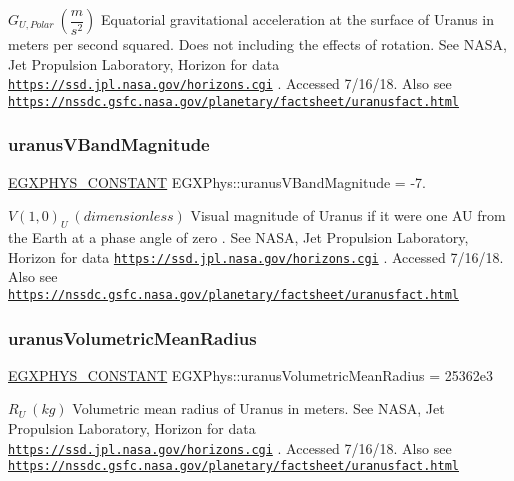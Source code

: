 $ G_{U,Polar} \ (\dfrac{m}{s^2})$ Equatorial gravitational acceleration at the surface of Uranus in meters per second squared. Does not including the effects of rotation. See N\+A\+SA, Jet Propulsion Laboratory, Horizon for data \href{https://ssd.jpl.nasa.gov/horizons.cgi}{\tt https\+://ssd.\+jpl.\+nasa.\+gov/horizons.\+cgi} . Accessed 7/16/18. Also see \href{https://nssdc.gsfc.nasa.gov/planetary/factsheet/uranusfact.html}{\tt https\+://nssdc.\+gsfc.\+nasa.\+gov/planetary/factsheet/uranusfact.\+html} \mbox{\label{group___e_g_x_phys-_constants-_astrophysics-_solar_system-_uranus-_bulk_ga781508a60603feae345f1941de8204fa}} 
\subsubsection{\texorpdfstring{uranus\+V\+Band\+Magnitude}{uranusVBandMagnitude}}
{\footnotesize\ttfamily \mbox{\hyperlink{group___e_g_x_phys-_constants-_macros_ga76980d288494ce1714c9ac68a95ba702}{E\+G\+X\+P\+H\+Y\+S\+\_\+\+C\+O\+N\+S\+T\+A\+NT}} E\+G\+X\+Phys\+::uranus\+V\+Band\+Magnitude = -\/7.}

$ V(1,0)_{U} \ (dimensionless)$ Visual magnitude of Uranus if it were one AU from the Earth at a phase angle of zero . See N\+A\+SA, Jet Propulsion Laboratory, Horizon for data \href{https://ssd.jpl.nasa.gov/horizons.cgi}{\tt https\+://ssd.\+jpl.\+nasa.\+gov/horizons.\+cgi} . Accessed 7/16/18. Also see \href{https://nssdc.gsfc.nasa.gov/planetary/factsheet/uranusfact.html}{\tt https\+://nssdc.\+gsfc.\+nasa.\+gov/planetary/factsheet/uranusfact.\+html} \mbox{\label{group___e_g_x_phys-_constants-_astrophysics-_solar_system-_uranus-_bulk_gae20d0e7177a2cc5b86297f1ab2cf8400}} 
\subsubsection{\texorpdfstring{uranus\+Volumetric\+Mean\+Radius}{uranusVolumetricMeanRadius}}
{\footnotesize\ttfamily \mbox{\hyperlink{group___e_g_x_phys-_constants-_macros_ga76980d288494ce1714c9ac68a95ba702}{E\+G\+X\+P\+H\+Y\+S\+\_\+\+C\+O\+N\+S\+T\+A\+NT}} E\+G\+X\+Phys\+::uranus\+Volumetric\+Mean\+Radius = 25362e3}

$R_{U} \ (kg)$ Volumetric mean radius of Uranus in meters. See N\+A\+SA, Jet Propulsion Laboratory, Horizon for data \href{https://ssd.jpl.nasa.gov/horizons.cgi}{\tt https\+://ssd.\+jpl.\+nasa.\+gov/horizons.\+cgi} . Accessed 7/16/18. Also see \href{https://nssdc.gsfc.nasa.gov/planetary/factsheet/uranusfact.html}{\tt https\+://nssdc.\+gsfc.\+nasa.\+gov/planetary/factsheet/uranusfact.\+html} 